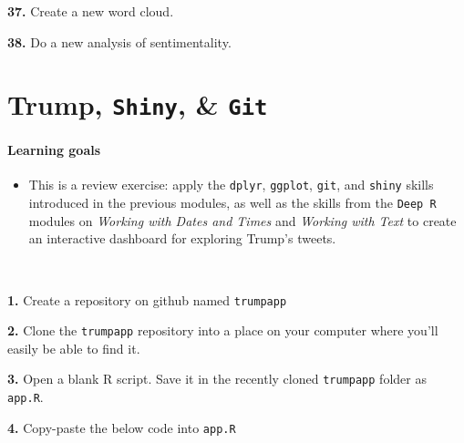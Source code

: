 \documentclass[]{book}
\providecommand{\tightlist}{%
  \setlength{\itemsep}{0pt}\setlength{\parskip}{0pt}}
\begin{document}
\textbf{37.} Create a new word cloud.

\textbf{38.} Do a new analysis of sentimentality.

\hypertarget{trump-shiny-git}{%
\chapter{\texorpdfstring{Trump, \texttt{Shiny}, \& \texttt{Git}}{Trump, Shiny, \& Git}}\label{trump-shiny-git}}

\hypertarget{learning-goals-24}{%
\subsubsection*{Learning goals}\label{learning-goals-24}}

\begin{itemize}
\tightlist
\item
  This is a review exercise: apply the \texttt{dplyr}, \texttt{ggplot}, \texttt{git}, and \texttt{shiny} skills introduced in the previous modules, as well as the skills from the \texttt{Deep\ R} modules on \emph{Working with Dates and Times} and \emph{Working with Text} to create an interactive dashboard for exploring Trump's tweets.
\end{itemize}

~

\textbf{1.} Create a repository on github named \texttt{trumpapp}

\textbf{2.} Clone the \texttt{trumpapp} repository into a place on your computer where you'll easily be able to find it.

\textbf{3.} Open a blank R script. Save it in the recently cloned \texttt{trumpapp} folder as \texttt{app.R}.

\textbf{4.} Copy-paste the below code into \texttt{app.R}
\end{document}
